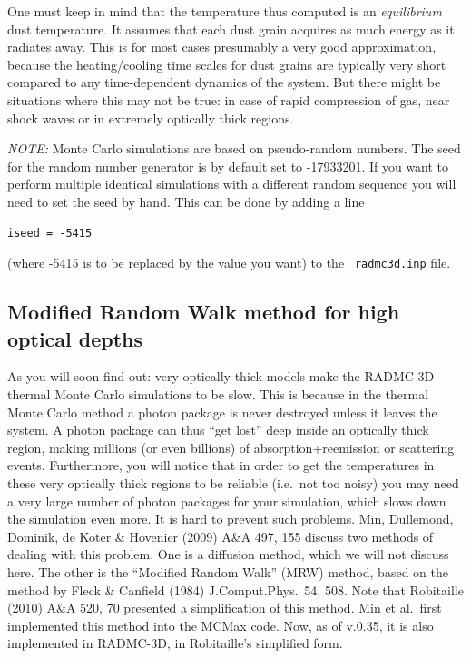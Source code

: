 \documentclass{report}
\begin{document}
One must keep in mind that the temperature thus computed is an {\em
  equilibrium} dust temperature. It assumes that each dust grain acquires as
much energy as it radiates away. This is for most cases presumably a 
very good approximation, because the heating/cooling time scales for 
dust grains are typically very short compared to any time-dependent 
dynamics of the system. But there might be situations where this may not
be true: in case of rapid compression of gas, near shock waves or in 
extremely optically thick regions.

{\em NOTE:} Monte Carlo simulations are based on pseudo-random numbers.
The seed for the random number generator is by default set to -17933201.
If you want to perform multiple identical simulations with a different
random sequence you will need to set the seed by hand. This can be
done by adding a line 
{\small\begin{verbatim}
iseed = -5415
\end{verbatim}}
(where -5415 is to be replaced by the value you want) to the {\small\tt
  radmc3d.inp} file.

\subsection{Modified Random Walk method for high optical depths}
\label{sec-modrandwalk}
%
As you will soon find out: very optically thick models make the RADMC-3D
thermal Monte Carlo simulations to be slow. This is because in the thermal
Monte Carlo method a photon package is never destroyed unless it leaves the
system. A photon package can thus ``get lost'' deep inside an optically
thick region, making millions (or even billions) of absorption+reemission or
scattering events. Furthermore, you will notice that in order to get the
temperatures in these very optically thick regions to be reliable (i.e.\ not
too noisy) you may need a very large number of photon packages for your
simulation, which slows down the simulation even more. It is hard to prevent
such problems. Min, Dullemond, Dominik, de Koter \& Hovenier (2009) A\&A
497, 155 discuss two methods of dealing with this problem. One is a
diffusion method, which we will not discuss here. The other is the
``Modified Random Walk'' (MRW) method, based on the method by Fleck \&
Canfield (1984) J.Comput.Phys.\ 54, 508. Note that Robitaille (2010) A\&A
520, 70 presented a simplification of this method. Min et al.\ first
implemented this method into the MCMax code. Now, as of v.0.35, it is also
implemented in RADMC-3D, in Robitaille's simplified form.
\end{document}
